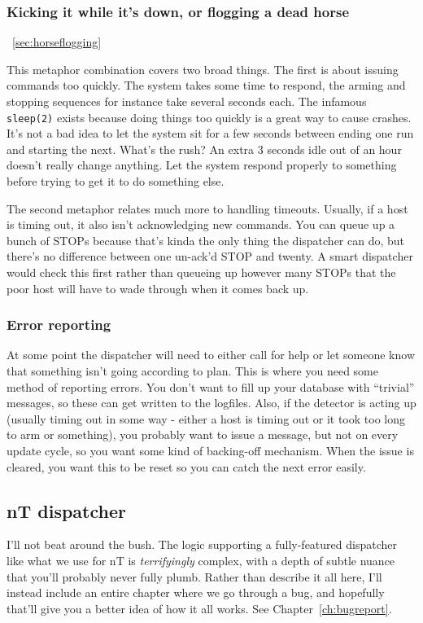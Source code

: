 \subsubsection{Kicking it while it's down, or flogging a dead horse}~\ref{sec:horseflogging}

This metaphor combination covers two broad things.
The first is about issuing commands too quickly.
The system takes some time to respond, the arming and stopping sequences for instance take several seconds each.
The infamous \texttt{sleep(2)} exists because doing things too quickly is a great way to cause crashes.
It's not a bad idea to let the system sit for a few seconds between ending one run and starting the next.
What's the rush?
An extra 3 seconds idle out of an hour doesn't really change anything.
Let the system respond properly to something before trying to get it to do something else.

The second metaphor relates much more to handling timeouts.
Usually, if a host is timing out, it also isn't acknowledging new commands.
You can queue up a bunch of STOPs because that's kinda the only thing the dispatcher can do, but there's no difference between one un-ack'd STOP and twenty.
A smart dispatcher would check this first rather than queueing up however many STOPs that the poor host will have to wade through when it comes back up.

\subsubsection{Error reporting}

At some point the dispatcher will need to either call for help or let someone know that something isn't going according to plan.
This is where you need some method of reporting errors.
You don't want to fill up your database with ``trivial'' messages, so these can get written to the logfiles.
Also, if the detector is acting up (usually timing out in some way - either a host is timing out or it took too long to arm or something), you probably want to issue a message, but not on every update cycle, so you want some kind of backing-off mechanism.
When the issue is cleared, you want this to be reset so you can catch the next error easily.

\subsection{nT dispatcher}

I'll not beat around the bush.
The logic supporting a fully-featured dispatcher like what we use for nT is \emph{terrifyingly} complex, with a depth of subtle nuance that you'll probably never fully plumb.
Rather than describe it all here, I'll instead include an entire chapter where we go through a bug, and hopefully that'll give you a better idea of how it all works.
See Chapter~\ref{ch:bugreport}.

